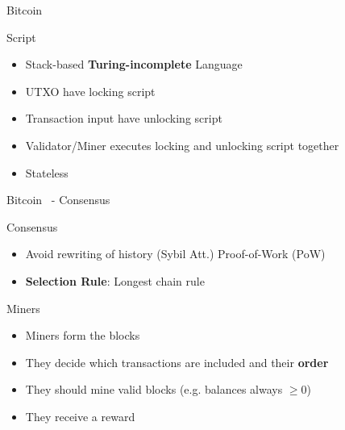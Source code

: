 \begin{frame}{Bitcoin~\cite{nakamoto2008bitcoin}}
\begin{block}{Script}
    \begin{itemize}
    \item Stack-based \textbf{Turing-incomplete} Language
    \item UTXO have locking script
    \item Transaction input have unlocking script
    \item Validator/Miner executes locking and unlocking script together
    \item Stateless
    \end{itemize}
    \end{block}
    
    \begin{center}
    \end{center}
\end{frame}


\begin{frame}{Bitcoin~\cite{nakamoto2008bitcoin} - Consensus}

\begin{block}{Consensus}
  \begin{itemize}
  \item Avoid rewriting of history (Sybil Att.) Proof-of-Work (PoW)
  \item \textbf{Selection Rule}: Longest chain rule
  \end{itemize}
\end{block}

\begin{block}{Miners}
\begin{itemize}
\item Miners form the blocks
\item They decide which transactions are included and their \textbf{order}
\item They should mine valid blocks (e.g. balances always $\geq 0$)
\item They receive a reward
\end{itemize}
\end{block}

\end{frame}

